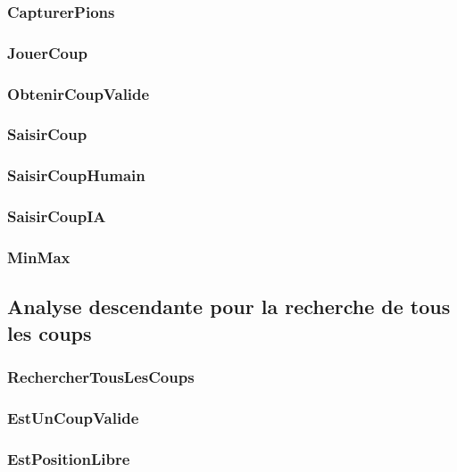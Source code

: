     \subsubsection{CapturerPions}
      
    \subsubsection{JouerCoup}
      
    \subsubsection{ObtenirCoupValide}
      
    \subsubsection{SaisirCoup}
      
    \subsubsection{SaisirCoupHumain}
      
    \subsubsection{SaisirCoupIA}
      
    \subsubsection{MinMax}
      


  \subsection{Analyse descendante pour la recherche de tous les coups}
    \subsubsection{RechercherTousLesCoups}
      
    \subsubsection{EstUnCoupValide}
      
    \subsubsection{EstPositionLibre}
      
